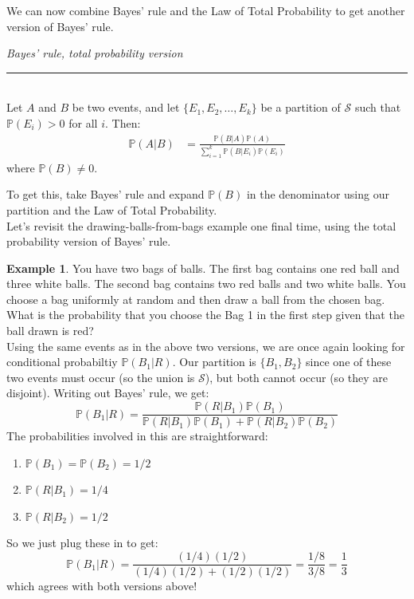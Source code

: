 \documentclass[12pt]{article}
\theoremstyle{definition}
\newtheorem*{example}{Example}
\theoremstyle{remark}
\def\P{{\mathbb P}}
\def\cals{{\mathcal S}}
\begin{document}
We can now combine Bayes' rule and the Law of Total Probability to get another version of Bayes' rule.

\begin{framed}
\emph{Bayes' rule, total probability version}\\
  \rule{\dimexpr{}\fboxrule}{.1pt} \\
Let $A$ and $B$ be two events, and let $\{E_1, E_2, \dots, E_k\}$ be a partition of $\cals$ such that $\P(E_i) > 0$ for all $i$. Then:
\begin{align*}
\P(A | B) &= \frac{ \P(B|A)\P(A)}{\sum_{i=1}^k \P(B|E_i)\P(E_i)}
\end{align*}
where $\P(B) \neq 0.$
\end{framed}
To get this, take Bayes' rule and expand $\P(B)$ in the denominator using our partition and the Law of Total Probability.\\

Let's revisit the drawing-balls-from-bags example one final time, using the total probability version of Bayes' rule.

\begin{example}You have two bags of balls. The first bag contains one red ball and three white balls. The second bag contains two red balls and two white balls. You choose a bag uniformly at random and then draw a ball from the chosen bag. What is the probability that you choose the Bag 1 in the first step given that the ball drawn is red?\\

Using the same events as in the above two versions, we are once again looking for conditional probabiltiy $\P(B_1|R)$. Our partition is $\{B_1, B_2\}$ since one of these two events must occur (so the union is $\cals$), but both cannot occur (so they are disjoint). Writing out Bayes' rule, we get:
\[
\P(B_1|R) = \frac{ \P(R|B_1)\P(B_1)}{ \P(R|B_1)\P(B_1) + \P(R|B_2)\P(B_2) }
\]
The probabilities involved in this are straightforward:
\begin{enumerate}
\item $\P(B_1) = \P(B_2) = 1/2$
\item $\P(R|B_1) = 1/4$
\item $\P(R|B_2) = 1/2$
\end{enumerate}
So we just plug these in to get:
\[
\P(B_1|R) = \frac{ (1/4)(1/2)}{(1/4)(1/2) + (1/2)(1/2) } = \frac{1/8}{3/8} = \frac{1}{3}
\]
which agrees with both versions above!
\end{example}
\end{document}

